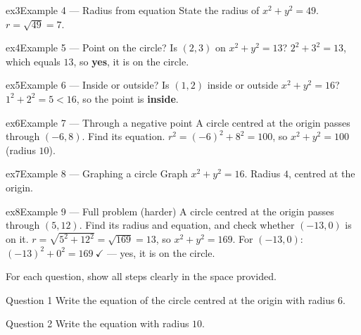 \documentclass[11pt]{article}
\begin{document}
\begin{example}{ex3}{Example 4 --- Radius from equation}
State the radius of $x^2+y^2=49$.
\soln $r=\sqrt{49}=7.$
\end{example}

\begin{example}{ex4}{Example 5 --- Point on the circle?}
Is $(2,3)$ on $x^2+y^2=13$?
\soln $2^2+3^2=13$, which equals $13$, so \textbf{yes}, it is on the circle.
\end{example}

\begin{example}{ex5}{Example 6 --- Inside or outside?}
Is $(1,2)$ inside or outside $x^2+y^2=16$?
\soln $1^2+2^2=5<16$, so the point is \textbf{inside}.
\end{example}

\begin{example}{ex6}{Example 7 --- Through a negative point}
A circle centred at the origin passes through $(-6,8)$. Find its equation.
\soln $r^2=(-6)^2+8^2=100$, so $x^2+y^2=100$ (radius $10$).
\end{example}

\begin{example}{ex7}{Example 8 --- Graphing a circle}
Graph $x^2+y^2=16$.
\soln Radius $4$, centred at the origin.
\end{example}

\begin{example}{ex8}{Example 9 --- Full problem (harder)}
A circle centred at the origin passes through $(5,12)$. Find its radius and equation, and check whether $(-13,0)$ is on it.
\soln $r=\sqrt{5^2+12^2}=\sqrt{169}=13$, so $x^2+y^2=169$. For $(-13,0)$: $(-13)^2+0^2=169\ \checkmark$ --- yes, it is on the circle.
\end{example}

\clearpage
{}
For each question, show all steps clearly in the space provided.

\begin{qbox}{Question 1}
Write the equation of the circle centred at the origin with radius $6$.\workspace{2.0cm}
\end{qbox}

\begin{qbox}{Question 2}
Write the equation with radius $10$.\workspace{2.0cm}
\end{qbox}
\end{document}
